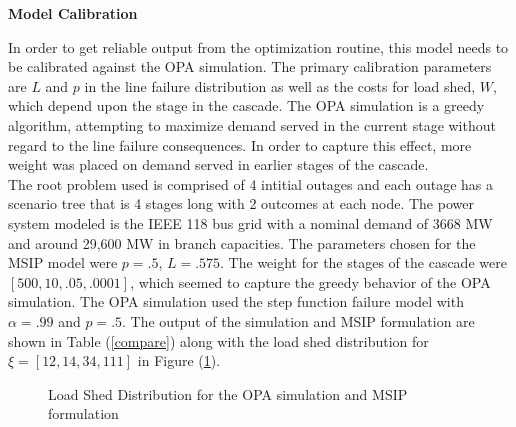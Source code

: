 \textbf{Model Calibration}

In order to get reliable output from the optimization routine, this model needs to be calibrated against the OPA simulation.  The primary calibration parameters are $L$ and $p$ in the line failure distribution as well as the costs for load shed, $W$, which depend upon the stage in the cascade.  The OPA simulation is a greedy algorithm, attempting to maximize demand served in the current stage without regard to the line failure consequences.  In order to capture this effect, more weight was placed on demand served in earlier stages of the cascade. \\

 The root problem used is comprised of 4 intitial outages and each outage has a scenario tree that is 4 stages long with 2 outcomes at each node.  The power system modeled is the IEEE 118 bus grid with a nominal demand of 3668 MW and around 29,600 MW in branch capacities.  The parameters chosen for the MSIP model were $p=.5$, $L =.575$.  The weight for the stages of the cascade were $[500, 10, .05, .0001]$, which seemed to capture the greedy behavior of the OPA simulation.  The OPA simulation used the step function failure model with $\alpha=.99$ and $p=.5$.  The output of the simulation and MSIP formulation are shown in Table (\ref{compare}) along with the load shed distribution for $\xi = [12,14,34,111]$ in Figure (\ref{dist}). 




\begin{figure}
 \centering
  \caption{Load Shed Distribution for the OPA simulation and MSIP formulation}
 \label{dist}
\end{figure}


